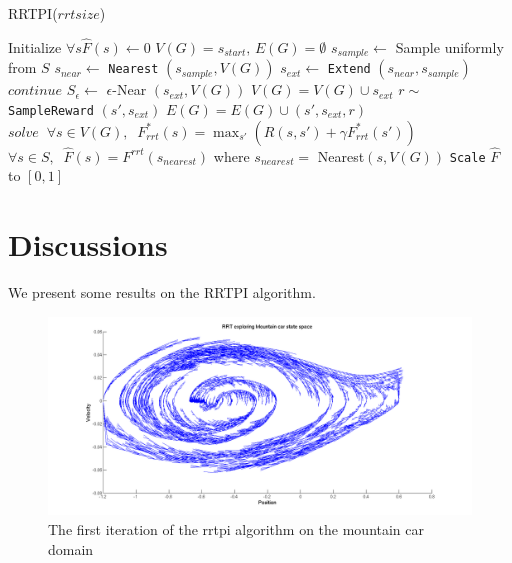 \documentclass[wcp]{jmlr}
\begin{document}
\begin{algorithm2e}
\caption{RRTPI($rrtsize$)}
\label{alg:rrtpi}
\dontprintsemicolon
Initialize $ \forall s \hat{F}(s) \leftarrow 0$\;
{
	$V(G)=s_{start},\,E(G)=\emptyset$\;
	{
		$s_{sample} \leftarrow$ Sample uniformly from $S$\;
		$s_{near} \leftarrow $ \texttt{Nearest} $(s_{sample},V(G))$\;
		$s_{ext} \leftarrow$ \texttt{Extend} $(s_{near},s_{sample})$\;
		{
		$continue$\;
		}
		$S_{\epsilon} \leftarrow$ $\epsilon$-Near $(s_{ext},V(G))$\;
		$V(G) = V(G) \cup s_{ext}$\;
		{		
			$r\sim$ \texttt{SampleReward} $(s',s_{ext})$\;
			$E(G) = E(G) \cup (s',s_{ext},r)$\;
		}	
	}
$solve\;\;\forall s \in V(G),\;\; F_{rrt}^*(s) = \max_{s'}( R(s,s') + \gamma F_{rrt}^*(s'))$\;
$\forall s \in S,\;\; \hat{F}(s) = F^{rrt}(s_{nearest})$ where $s_{nearest} =$ Nearest$(s,V(G))$ \;
\texttt{Scale} $\hat{F}$ to $[0,1]$
}
\end{algorithm2e}

\section{Discussions}
 We present some results on the RRTPI algorithm.\\
\begin{figure}[htb]
\centering
\label{fig:val1}
\includegraphics[width=450px]{rggpi.png}
\caption{The first iteration of the rrtpi algorithm on the mountain car domain}
\end{figure}
\end{document}
